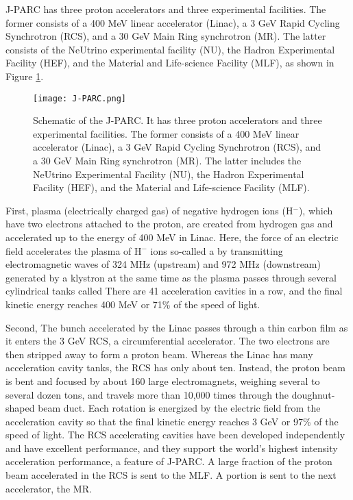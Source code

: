 J-PARC has three proton accelerators and three experimental facilities. The former consists of a 400 MeV linear accelerator (Linac), a 3 GeV Rapid Cycling Synchrotron (RCS), and a 30 GeV Main Ring synchrotron (MR). The latter consists of the NeUtrino experimental facility (NU), the Hadron Experimental Facility (HEF), and the Material and Life-science Facility (MLF), as shown in Figure \ref{fig-J-PARC}. 
\begin{figure}[!h]
 \begin{center}
   \texttt{[image: J-PARC.png]}
   \caption{Schematic of the J-PARC. It has three proton accelerators and three experimental facilities. The former consists of a 400 MeV linear accelerator (Linac), a 3 GeV Rapid Cycling Synchrotron (RCS), and a 30 GeV Main Ring synchrotron (MR). The latter includes the NeUtrino Experimental Facility (NU), the Hadron Experimental Facility (HEF), and the Material and Life-science Facility (MLF).}
   \label{fig-J-PARC}
 \end{center}
\end{figure}

First, plasma (electrically charged gas) of negative hydrogen ions (H$^-$), which have two electrons attached to the proton, are created from hydrogen gas and accelerated up to the energy of 400 MeV in Linac. Here, the force of an electric field accelerates the plasma of H$^-$ ions so-called a  by transmitting electromagnetic waves of 324 MHz (upstream) and 972 MHz (downstream) generated by a klystron at the same time as the plasma passes through several cylindrical tanks called  There are 41 acceleration cavities in a row, and the final kinetic energy reaches 400 MeV or 71\% of the speed of light.

Second, The bunch accelerated by the Linac passes through a thin carbon film as it enters the 3 GeV RCS, a circumferential accelerator. The two electrons are then stripped away to form a proton beam. Whereas the Linac has many acceleration cavity tanks, the RCS has only about ten. Instead, the proton beam is bent and focused by about 160 large electromagnets, weighing several to several dozen tons, and travels more than 10,000 times through the doughnut-shaped beam duct. Each rotation is energized by the electric field from the acceleration cavity so that the final kinetic energy reaches 3 GeV or 97\% of the speed of light. The RCS accelerating cavities have been developed independently and have excellent performance, and they support the world's highest intensity acceleration performance, a feature of J-PARC. A large fraction of the proton beam accelerated in the RCS is sent to the MLF. A portion is sent to the next accelerator, the MR.

